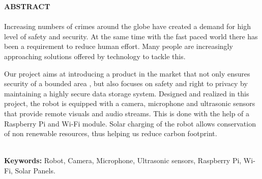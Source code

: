 \begin{center}
\thispagestyle{empty}
\vspace{2cm}
\LARGE{\textbf{ABSTRACT}}\\[1.0cm]
\end{center}
\thispagestyle{empty}
\large{\paragraph{}Increasing numbers of crimes around the globe have created a demand for high level of safety and security. At the same time with the fast paced world there has been a requirement to reduce human effort. Many  people are increasingly approaching solutions offered by technology to tackle this.
\newline

Our project aims at introducing a product in the market that not only ensures security of a bounded area , but also focuses on safety and right to privacy by maintaining a highly secure data storage system. Designed and realized in this project, the robot is equipped with a camera, microphone and ultrasonic sensors that  provide remote visuals and audio streams. This is done with the help of a Raspberry Pi and Wi-Fi module. Solar charging of the robot allows conservation of non renewable resources, thus helping us reduce carbon footprint.
}\\
\newline
\textbf{Keywords: }Robot, Camera, Microphone, Ultrasonic sensors, Raspberry Pi, Wi-Fi, Solar Panels.